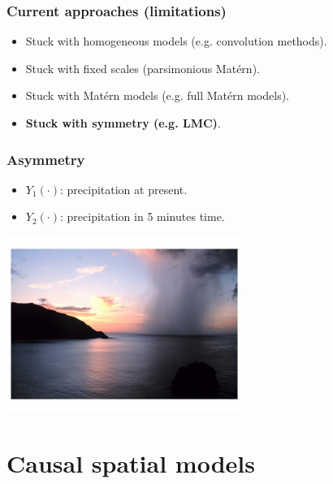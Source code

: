 \documentclass{beamer}
\begin{document}

\begin{frame}
\frametitle{Current approaches (limitations)}

\begin{itemize}
\item Stuck with homogeneous models (e.g. convolution methods). \vfill
\item Stuck with fixed scales (parsimonious Matérn). \vfill
\item Stuck with Matérn models (e.g. full Matérn models). \vfill
\item {\bf Stuck with symmetry (e.g. LMC)}. \vfill
\end{itemize}

\end{frame}


\begin{frame}
\frametitle{Asymmetry}

\begin{itemize}
\item $Y_1(\cdot)$: precipitation at present.        
\item $Y_2(\cdot)$: precipitation in 5 minutes time.
\end{itemize}

\begin{center}
\includegraphics[width=3in]{rain.png}
\end{center}
\end{frame}


\section{Causal spatial models}

\begin{frame}
\sectionpage
\end{frame}
\end{document}
